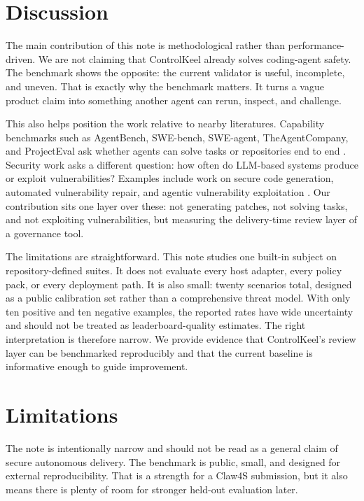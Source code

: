 \documentclass[10pt]{article}
\begin{document}
\section{Discussion}

The main contribution of this note is methodological rather than performance-driven. We are not claiming that ControlKeel already solves coding-agent safety. The benchmark shows the opposite: the current validator is useful, incomplete, and uneven. That is exactly why the benchmark matters. It turns a vague product claim into something another agent can rerun, inspect, and challenge.

This also helps position the work relative to nearby literatures. Capability benchmarks such as AgentBench, SWE-bench, SWE-agent, TheAgentCompany, and ProjectEval ask whether agents can solve tasks or repositories end to end \cite{agentbench,swebench,sweagent,theagentcompany,projecteval}. Security work asks a different question: how often do LLM-based systems produce or exploit vulnerabilities? Examples include work on secure code generation, automated vulnerability repair, and agentic vulnerability exploitation \cite{securecodegen,vrpilot,zeroday}. Our contribution sits one layer over these: not generating patches, not solving tasks, and not exploiting vulnerabilities, but measuring the delivery-time review layer of a governance tool.

The limitations are straightforward. This note studies one built-in subject on repository-defined suites. It does not evaluate every host adapter, every policy pack, or every deployment path. It is also small: twenty scenarios total, designed as a public calibration set rather than a comprehensive threat model. With only ten positive and ten negative examples, the reported rates have wide uncertainty and should not be treated as leaderboard-quality estimates. The right interpretation is therefore narrow. We provide evidence that ControlKeel's review layer can be benchmarked reproducibly and that the current baseline is informative enough to guide improvement.

\section*{Limitations}
\small
The note is intentionally narrow and should not be read as a general claim of secure autonomous delivery. The benchmark is public, small, and designed for external reproducibility. That is a strength for a Claw4S submission, but it also means there is plenty of room for stronger held-out evaluation later.
\end{document}
